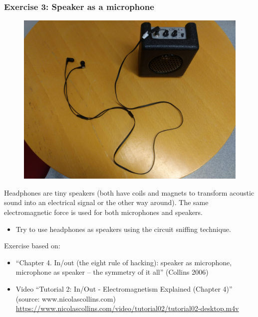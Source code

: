 \documentclass[screen, aspectratio=169]{beamer}
\begin{document}
\begin{frame}
  \frametitle{Exercise 3: Speaker as a microphone}
 \begin{figure}
	\includegraphics[scale=0.05]{img/coilsamps.jpg}
\end{figure}
{\scriptsize 
Headphones are tiny speakers (both have coils and magnets to transform acoustic sound into an electrical signal or the other way around). The same electromagnetic force is used for both microphones and speakers.
    \begin{itemize}
	\item Try to use headphones as speakers using the circuit sniffing technique.    
    \end{itemize}
 }   
    {\tiny Exercise based on:
     \begin{itemize}
    	\item ``Chapter 4. In/out (the eight rule of hacking): speaker as microphone, microphone as speaker -- the symmetry of it all'' (Collins 2006)
	\item Video ``Tutorial 2: In/Out - Electromagnetism Explained (Chapter 4)'' (source: www.nicolascollins.com)\\ 
	\url{https://www.nicolascollins.com/video/tutorial02/tutorial02-desktop.m4v} 
      \end{itemize}	
    }
       
\end{frame}

%
\end{document}

